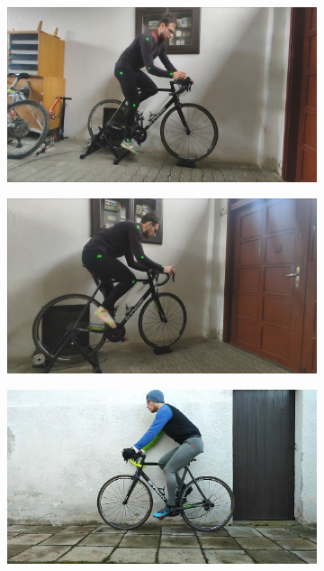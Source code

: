 \begin{figure}[htbp]
\begin{subfigure}[b]{\imgwidth}
        \includegraphics[width=1\linewidth]{obrazky-figures/6.jpg}
    \end{subfigure}
    \begin{subfigure}[b]{\imgwidth}
        \centering

        \includegraphics[width=1\linewidth]{obrazky-figures/7.jpg}

    \end{subfigure}
    \hfill
    \begin{subfigure}[b]{\imgwidth}
        \centering

        \includegraphics[width=1\linewidth]{obrazky-figures/8.jpg}


\end{subfigure}
\end{figure}
